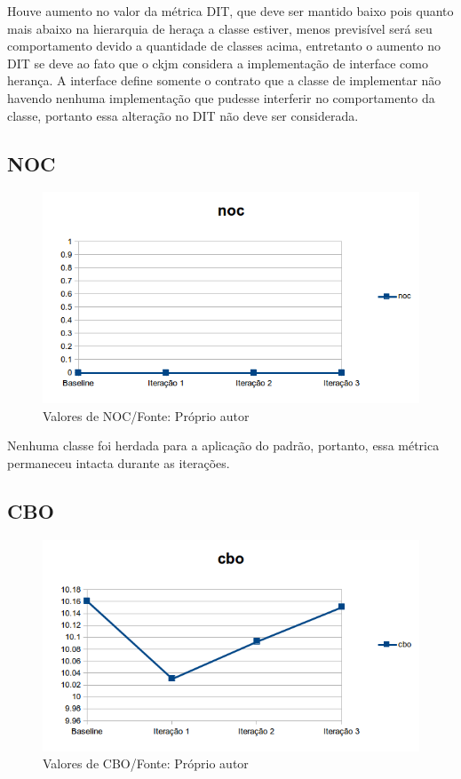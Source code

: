 Houve aumento no valor da métrica DIT, que deve ser mantido baixo pois quanto
mais abaixo na hierarquia de heraça a classe estiver, menos previsível será seu
comportamento devido a quantidade de classes acima, entretanto o aumento no DIT
se deve ao fato que o ckjm considera a implementação de interface como herança.
A interface define somente o contrato que a classe de implementar não havendo
nenhuma implementação que pudesse interferir no comportamento da classe,
portanto essa alteração no DIT não deve ser considerada.


\subsection{NOC}

\begin{figure}[h]
	\centering
	\includegraphics{img/noc.png}
	\caption{Valores de NOC/Fonte: Próprio autor}
	\label{fig:noc}
\end{figure}

Nenhuma classe foi herdada para a aplicação do padrão, portanto, essa métrica permaneceu intacta durante as iterações.

\subsection{CBO}

\begin{figure}[h]
	\centering
	\includegraphics{img/cbo.png}
	\caption{Valores de CBO/Fonte: Próprio autor}
	\label{fig:cbo}
\end{figure}

